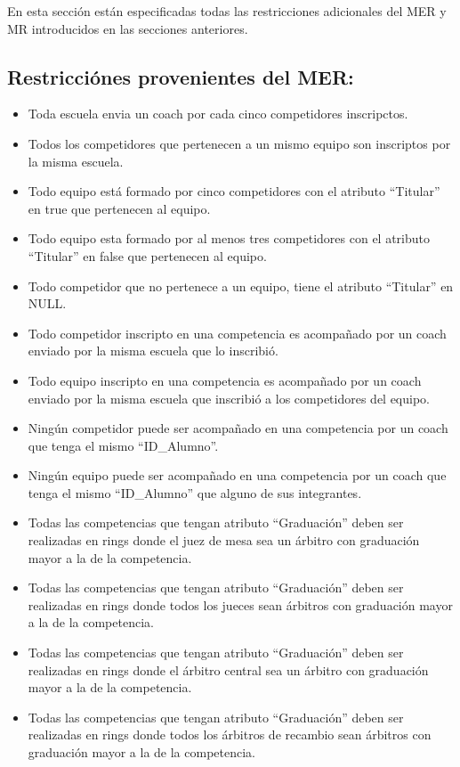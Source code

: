 En esta sección están especificadas todas las restricciones adicionales del MER y MR introducidos en las secciones anteriores.

\subsection{Restricciónes provenientes del MER:}
\begin{itemize}
\item Toda escuela envia un coach por cada cinco competidores inscripctos.
\item Todos los competidores que pertenecen a un mismo equipo son inscriptos por la misma escuela.
\item Todo equipo está formado por cinco competidores con el atributo ``Titular'' en true que pertenecen al equipo.
\item Todo equipo esta formado por al menos tres competidores con el atributo ``Titular'' en false que pertenecen al equipo.
\item Todo competidor que no pertenece a un equipo, tiene el atributo ``Titular'' en NULL.
\item Todo competidor inscripto en una competencia es acompañado por un coach enviado por la misma escuela que lo inscribió.
\item Todo equipo inscripto en una competencia es acompañado por un coach enviado por la misma escuela que inscribió a los competidores del equipo.
\item Ningún competidor puede ser acompañado en una competencia por un coach que tenga el mismo ``ID_Alumno''.
\item Ningún equipo puede ser acompañado en una competencia por un coach que tenga el mismo ``ID_Alumno'' que alguno de sus integrantes.
\item Todas las competencias que tengan atributo ``Graduación'' deben ser realizadas en rings donde el juez de mesa sea un árbitro con graduación mayor a la de la competencia.
\item Todas las competencias que tengan atributo ``Graduación'' deben ser realizadas en rings donde todos los jueces sean árbitros con graduación mayor a la de la competencia.
\item Todas las competencias que tengan atributo ``Graduación'' deben ser realizadas en rings donde el árbitro central sea un árbitro con graduación mayor a la de la competencia.
\item Todas las competencias que tengan atributo ``Graduación'' deben ser realizadas en rings donde todos los árbitros de recambio sean árbitros con graduación mayor a la de la competencia.

\end{itemize}
